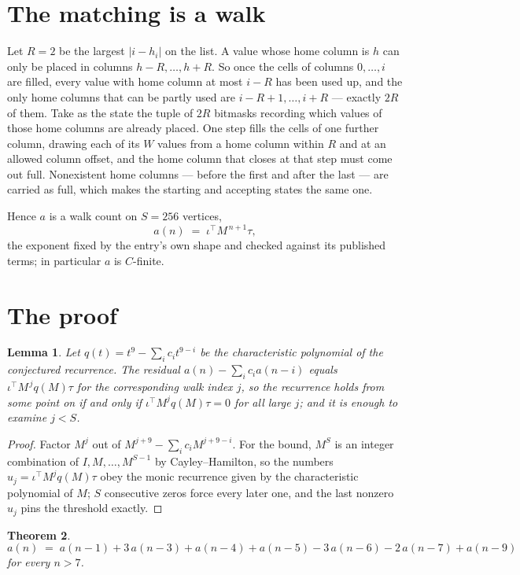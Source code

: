 \documentclass[11pt,a4paper]{article}
\theoremstyle{plain}
\newtheorem{theorem}{Theorem}
\newtheorem{lemma}[theorem]{Lemma}
\theoremstyle{definition}
\begin{document}
\section{The matching is a walk}

Let $R=2$ be the largest $|i-h_i|$ on the list. A value whose home column is $h$ can only be
placed in columns $h-R,\dots,h+R$. So once the cells of columns $0,\dots,i$ are filled, every
value with home column at most $i-R$ has been used up, and the only home columns that can be
partly used are $i-R+1,\dots,i+R$ --- exactly $2R$ of them. Take as the state the tuple of
$2R$ bitmasks recording which values of those home columns are already placed. One step fills
the cells of one further column, drawing each of its $W$ values from a home column within $R$
and at an allowed column offset, and the home column that closes at that step must come out
full. Nonexistent home columns --- before the first and after the last --- are carried as
full, which makes the starting and accepting states the same one.

Hence $a$ is a walk count on $S=256$ vertices,
\[
a(n)\;=\;\iota^{\!\top}M^{\,n+1}\tau ,
\]
the exponent fixed by the entry's own shape and checked against its published terms; in
particular $a$ is $C$-finite.

\section{The proof}

\begin{lemma}\label{lem:crit}
Let $q(t)=t^{9}-\sum_i c_it^{9-i}$ be the characteristic polynomial of the
conjectured recurrence. The residual $a(n)-\sum_ic_ia(n-i)$ equals
$\iota^{\!\top}M^{\,j}q(M)\tau$ for the corresponding walk index $j$, so the recurrence
holds from some point on if and only if $\iota^{\!\top}M^{j}q(M)\tau=0$ for all large $j$;
and it is enough to examine $j<S$.
\end{lemma}

\begin{proof}
Factor $M^{j}$ out of $M^{j+9}-\sum_ic_iM^{j+9-i}$. For the bound, $M^{S}$
is an integer combination of $I,M,\dots,M^{S-1}$ by Cayley--Hamilton, so the numbers
$u_j=\iota^{\!\top}M^{j}q(M)\tau$ obey the monic recurrence given by the characteristic
polynomial of $M$; $S$ consecutive zeros force every later one, and the last nonzero $u_j$
pins the threshold exactly.
\end{proof}

\begin{theorem}
\[
a(n)\;=\;a(n-1) + 3\,a(n-3) + a(n-4) + a(n-5) - 3\,a(n-6) - 2\,a(n-7) + a(n-9)
\]
for every $n>7$.
\end{theorem}
\end{document}
